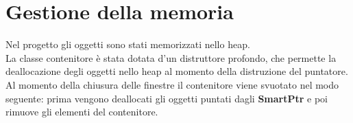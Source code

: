 \section{Gestione della memoria}{
	Nel progetto \textbf{\ggt} gli oggetti sono stati memorizzati nello heap. \\
	La classe contenitore è stata dotata d'un distruttore profondo, che permette la deallocazione degli oggetti nello heap al momento della distruzione del puntatore. \\
	Al momento della chiusura delle finestre il contenitore viene svuotato nel modo seguente: prima vengono deallocati gli oggetti puntati dagli \textbf{SmartPtr} e poi rimuove gli elementi del contenitore.
}